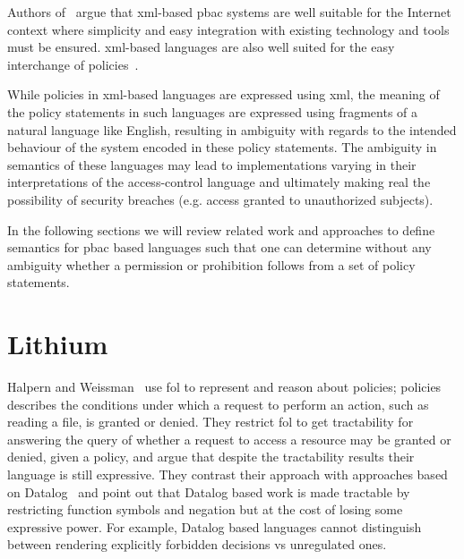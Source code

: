 Authors of~\cite{ArdagnaDVS04} argue that \ac{xml}-based \ac{pbac} systems are well suitable for the Internet context where simplicity and easy integration with existing technology and tools must be ensured. \ac{xml}-based languages are also well suited for the easy interchange of policies~\cite{ArdagnaDVS04}. 

While policies in \ac{xml}-based languages are expressed using \ac{xml}, the meaning of the policy statements in such languages are expressed using fragments of a natural language like English, resulting in ambiguity with regards to the intended behaviour of the system encoded in these policy statements. The ambiguity in semantics of these languages may lead to implementations varying in their interpretations of the access-control language and ultimately making real the possibility of security breaches (e.g. access granted to unauthorized subjects). 

In the following sections we will review related work and approaches to define semantics for \ac{pbac} based languages such that one can determine without any ambiguity whether a permission or prohibition follows from a set of policy statements.
 
\section{Lithium}
Halpern and Weissman~\cite{Halpern2008} use \ac{fol} to represent and reason about policies; policies describes the conditions under which a request to perform an action, such as reading a file, is granted or denied. They restrict \ac{fol} to get tractability for answering the query of whether a request to access a resource may be granted or denied, given a policy, and argue that despite the tractability results their language is still expressive. They contrast their approach with approaches based on Datalog~\cite{datalog} and point out that Datalog based work is made tractable by restricting function symbols and negation but at the cost of losing some expressive power. For example, Datalog based languages cannot distinguish between rendering explicitly forbidden decisions vs unregulated ones.

